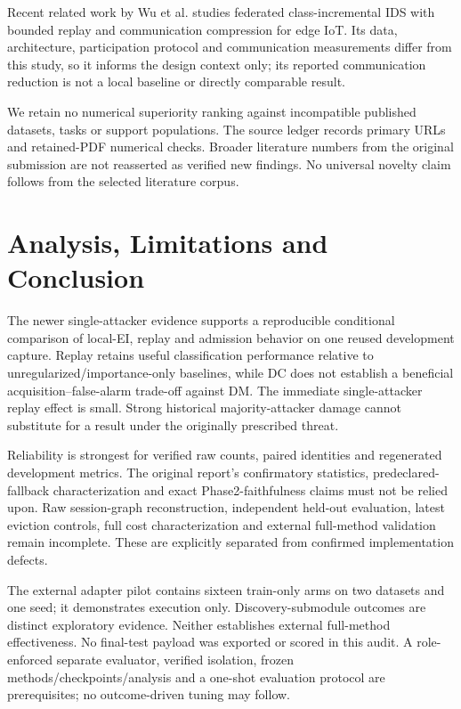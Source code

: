 \documentclass[10pt,a4paper]{article}
\begin{document}
Recent related work by Wu et al. \cite{edgefedcil} studies federated class-incremental IDS with bounded replay and communication compression for edge IoT. Its data, architecture, participation protocol and communication measurements differ from this study, so it informs the design context only; its reported communication reduction is not a local baseline or directly comparable result.

We retain no numerical superiority ranking against incompatible published datasets, tasks or support populations. The source ledger records primary URLs and retained-PDF numerical checks. Broader literature numbers from the original submission are not reasserted as verified new findings. No universal novelty claim follows from the selected literature corpus.

\section{Analysis, Limitations and Conclusion}
The newer single-attacker evidence supports a reproducible conditional comparison of local-EI, replay and admission behavior on one reused development capture. Replay retains useful classification performance relative to unregularized/importance-only baselines, while DC does not establish a beneficial acquisition--false-alarm trade-off against DM. The immediate single-attacker replay effect is small. Strong historical majority-attacker damage cannot substitute for a result under the originally prescribed threat.

Reliability is strongest for verified raw counts, paired identities and regenerated development metrics. The original report's confirmatory statistics, predeclared-fallback characterization and exact Phase2-faithfulness claims must not be relied upon. Raw session-graph reconstruction, independent held-out evaluation, latest eviction controls, full cost characterization and external full-method validation remain incomplete. These are explicitly separated from confirmed implementation defects.

The external adapter pilot contains sixteen train-only arms on two datasets and one seed; it demonstrates execution only. Discovery-submodule outcomes are distinct exploratory evidence. Neither establishes external full-method effectiveness. No final-test payload was exported or scored in this audit. A role-enforced separate evaluator, verified isolation, frozen methods/checkpoints/analysis and a one-shot evaluation protocol are prerequisites; no outcome-driven tuning may follow.
\end{document}
